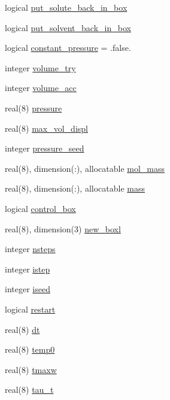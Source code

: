 \begin{DoxyCompactItemize}
\item 
logical \hyperlink{classmd_a5acb428a8473872b05c614e8522dd060}{put\-\_\-solute\-\_\-back\-\_\-in\-\_\-box}
\item 
logical \hyperlink{classmd_a6b635c744c91b56902713bc6cae1dfae}{put\-\_\-solvent\-\_\-back\-\_\-in\-\_\-box}
\item 
logical \hyperlink{classmd_ae93d83361cefab11ecaadabb651a18ca}{constant\-\_\-pressure} = .false.
\item 
integer \hyperlink{classmd_a7246eabdc87cc706c07e7c80bf0b8a30}{volume\-\_\-try}
\item 
integer \hyperlink{classmd_aadcb8922310a49876dd1f9fe68f5f827}{volume\-\_\-acc}
\item 
real(8) \hyperlink{classmd_adcfed0a4003cec6e8b5046fd8e48937e}{pressure}
\item 
real(8) \hyperlink{classmd_a3101b7169d48d4ae8728de15cc02674b}{max\-\_\-vol\-\_\-displ}
\item 
integer \hyperlink{classmd_a777487feefbdd6df569b14f8bf8393d8}{pressure\-\_\-seed}
\item 
real(8), dimension(\-:), allocatable \hyperlink{classmd_a87331b9b984a7e0be2087e459611064c}{mol\-\_\-mass}
\item 
real(8), dimension(\-:), allocatable \hyperlink{classmd_a189ad15cf49f9a89a65a26f2fb9783ad}{mass}
\item 
logical \hyperlink{classmd_aafecad42c4f7d4a9ad67d52e744a087b}{control\-\_\-box}
\item 
real(8), dimension(3) \hyperlink{classmd_a47591eaaa5473ebecfd55e728e00e441}{new\-\_\-boxl}
\item 
integer \hyperlink{classmd_a5475420ffea3758ca4d33e95c8ffc194}{nsteps}
\item 
integer \hyperlink{classmd_abb1c2551002e22c44a1fc774a1afcefc}{istep}
\item 
integer \hyperlink{classmd_a331bc68dc7891f2de33ea5d390b68f9c}{iseed}
\item 
logical \hyperlink{classmd_a5e065ccb1c0bcd84e07c0033b0dbac53}{restart}
\item 
real(8) \hyperlink{classmd_aeb13ba6424a8d9a774836510778185c2}{dt}
\item 
real(8) \hyperlink{classmd_ac81d21f541b0c26e6db7c5fa3aafba49}{temp0}
\item 
real(8) \hyperlink{classmd_ac8831874fbf44af6732e4d6c1af21c7a}{tmaxw}
\item 
real(8) \hyperlink{classmd_a1eecc6d7fec8a7908e06a194890e873c}{tau\-\_\-t}
\item 

\end{DoxyCompactItemize}
